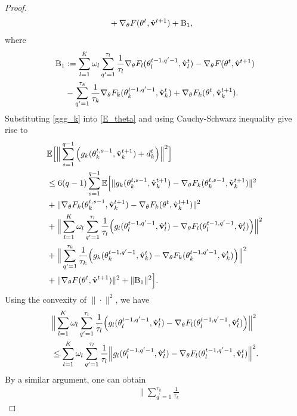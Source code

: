 \documentclass[twoside,journal]{IEEEtran}
\def\VectorFont{\bf}
\newcommand{\vv}{{\VectorFont v}}
\begin{document}
\begin{proof}
\begin{align}
&+\nabla_{\theta}F(\theta^{t},\hat{\vv}^{t+1})+\textmd{B}_1,
\end{align}
where
\begin{align*}
\textmd{B}_1&:=\sum_{l=1}^K\omega_l\sum_{q^\prime=1}^{\tau_l}\frac{1}{\tau_l}
\nabla_{\theta} F_l(\theta_l^{t-1,q^\prime-1}, \hat \vv_l^{t})
-\nabla_{\theta}F(\theta^{t},\hat{\vv}^{t+1})\\
&-
\sum_{q^\prime=1}^{\tau_k}\frac{1}{\tau_k}
\nabla_{\theta} F_k(\theta_k^{t-1,q^\prime-1}, \hat \vv_k^{t})+
\nabla_{\theta}F_k(\theta^{t},\hat{\vv}_k^{t+1}).
\end{align*}
Substituting \eqref{ggg_k} into \eqref{E_theta} and using Cauchy-Schwarz inequality give rise to
\begin{align}\label{Ebig}
\nonumber&\mathbb{E}\Big[\Big\|\sum_{s=1}^{q-1}\Big(g_k(\theta_k^{t,s-1},\hat{\vv}_k^{t+1})
+d_k^t\Big)\Big\|^2\Big]\\
\nonumber&\leq6(q-1)\sum_{s=1}^{q-1}\mathbb{E}\Big[\|g_k(\theta_k^{t,s-1},\hat{\vv}_k^{t+1})-\nabla_{\theta} F_k(\theta_k^{t,s-1},\hat{\vv}_k^{t+1})\|^2\\
\nonumber&+\|\nabla_{\theta} F_k(\theta_k^{t,s-1},\hat{\vv}_k^{t+1})
-\nabla_{\theta}F_k(\theta^{t},\hat{\vv}_k^{t+1})\|^2\\
\nonumber&+\Big\|\sum_{l=1}^K\omega_l\sum_{q^\prime=1}^{\tau_l}\frac{1}{\tau_l}
\Big(g_l(\theta_l^{t-1,q^\prime-1}, \hat \vv_l^{t})-
\nabla_{\theta} F_l(\theta_l^{t-1,q^\prime-1}, \hat \vv_l^{t})\Big)\Big\|^2\\
\nonumber&+\Big\|\sum_{q^\prime=1}^{\tau_k}\frac{1}{\tau_k}
\Big(g_k(\theta_k^{t-1,q^\prime-1}, \hat \vv_k^{t})-
\nabla_{\theta} F_k(\theta_k^{t-1,q^\prime-1}, \hat \vv_k^{t})\Big)\Big\|^2\\
&+\|\nabla_{\theta}F(\theta^{t},\hat{\vv}^{t+1})\|^2+\|\textmd{B}_1\|^2\Big].
\end{align}
Using the convexity of $\|\cdot\|^2$, we have
\begin{align*}
 &\Big\|\sum_{l=1}^K\omega_l\sum_{q^\prime=1}^{\tau_l}\frac{1}{\tau_l}
\Big(g_l(\theta_l^{t-1,q^\prime-1}, \hat \vv_l^{t})-
\nabla_{\theta} F_l(\theta_l^{t-1,q^\prime-1}, \hat \vv_l^{t})\Big)\Big\|^2\\
&\leq\sum_{l=1}^K\omega_l\sum_{q^\prime=1}^{\tau_l}\frac{1}{\tau_l} \Big\|
g_l(\theta_l^{t-1,q^\prime-1}, \hat \vv_l^{t})-
\nabla_{\theta} F_l(\theta_l^{t-1,q^\prime-1}, \hat \vv_l^{t})\Big\|^2.
\end{align*}
By a similar argument, one can obtain
\begin{align*}
&\Big\|\sum_{q^\prime=1}^{\tau_k}\frac{1}{\tau_k}

\end{align*}
\end{proof}
\end{document}
